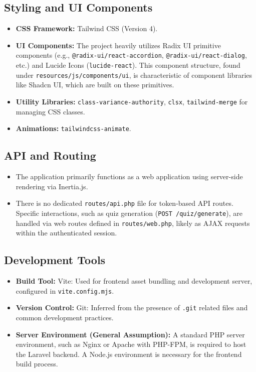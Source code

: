 \documentclass[12pt,a4paper]{article}
\begin{document}
\subsection{Styling and UI Components}
\begin{itemize}
    \item \textbf{CSS Framework:} Tailwind CSS (Version 4).
    \item \textbf{UI Components:} The project heavily utilizes Radix UI primitive components (e.g., \texttt{@radix-ui/react-accordion}, \texttt{@radix-ui/react-dialog}, etc.) and Lucide Icons (\texttt{lucide-react}). This component structure, found under \texttt{resources/js/components/ui}, is characteristic of component libraries like Shadcn UI, which are built on these primitives.
    \item \textbf{Utility Libraries:} \texttt{class-variance-authority}, \texttt{clsx}, \texttt{tailwind-merge} for managing CSS classes.
    \item \textbf{Animations:} \texttt{tailwindcss-animate}.
\end{itemize}

\subsection{API and Routing}
\begin{itemize}
    \item The application primarily functions as a web application using server-side rendering via Inertia.js.
    \item There is no dedicated \texttt{routes/api.php} file for token-based API routes. Specific interactions, such as quiz generation (\texttt{POST /quiz/generate}), are handled via web routes defined in \texttt{routes/web.php}, likely as AJAX requests within the authenticated session.
\end{itemize}

\subsection{Development Tools}
\begin{itemize}
    \item \textbf{Build Tool:} Vite: Used for frontend asset bundling and development server, configured in \texttt{vite.config.mjs}.
    \item \textbf{Version Control:} Git: Inferred from the presence of \texttt{.git} related files and common development practices.
    \item \textbf{Server Environment (General Assumption):} A standard PHP server environment, such as Nginx or Apache with PHP-FPM, is required to host the Laravel backend. A Node.js environment is necessary for the frontend build process.
\end{itemize}
\end{document}
